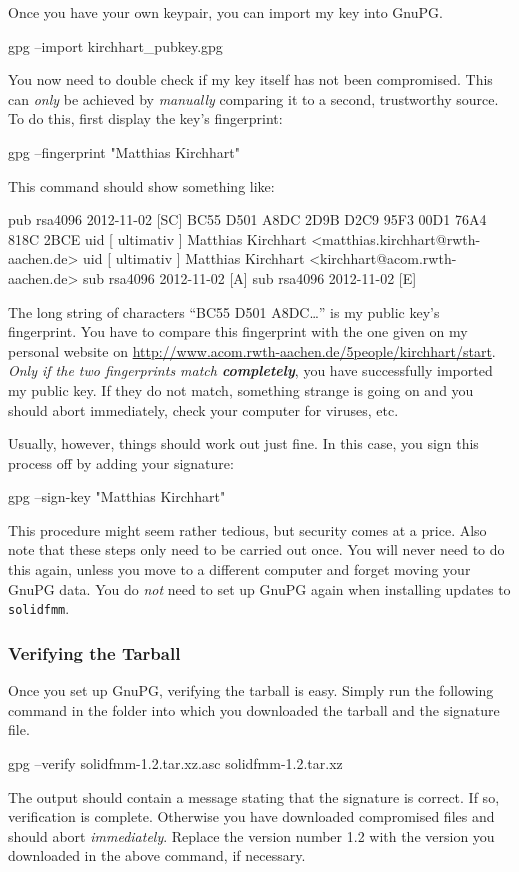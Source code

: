 \documentclass{scrbook}
\newcommand{\solidfmm}{\texttt{solidfmm}}
\begin{document}
Once you have your own keypair, you can import my key into GnuPG.
\begin{commandshell*}
gpg --import kirchhart_pubkey.gpg
\end{commandshell*}
You now need to double check if my key itself has not been compromised. This
can \emph{only} be achieved by \emph{manually} comparing it to a second,
trustworthy source. To do this, first display the key's fingerprint:
\begin{commandshell*}
gpg --fingerprint "Matthias Kirchhart"
\end{commandshell*}
This command should show something like:
\begin{commandshell*}
pub   rsa4096 2012-11-02 [SC]
      BC55 D501 A8DC 2D9B D2C9  95F3 00D1 76A4 818C 2BCE
uid        [ ultimativ ] Matthias Kirchhart <matthias.kirchhart@rwth-aachen.de>
uid        [ ultimativ ] Matthias Kirchhart <kirchhart@acom.rwth-aachen.de>
sub   rsa4096 2012-11-02 [A]
sub   rsa4096 2012-11-02 [E]
\end{commandshell*}
The long string of characters \enquote{BC55 D501 A8DC…} is my public key's
fingerprint. You have to compare this fingerprint with the one given on
my personal website on
\url{http://www.acom.rwth-aachen.de/5people/kirchhart/start}.
\emph{Only if the two fingerprints match \textbf{completely}}, you have
successfully imported my public key. If they do not match, something strange
is going on and you should abort immediately, check your computer for viruses,
etc.

Usually, however, things should work out just fine. In this case, you sign this
process off by adding your signature:
\begin{commandshell*}
gpg --sign-key "Matthias Kirchhart"
\end{commandshell*}
This procedure might seem rather tedious, but security comes at a price. Also
note  that these steps only need to be carried out once. You will never need to
do this again, unless you move to a different computer and forget moving your
GnuPG data. You do \emph{not} need to set up GnuPG again when installing
updates to \solidfmm.

\subsubsection{Verifying the Tarball}
Once you set up GnuPG, verifying the tarball is easy. Simply run the following
command in the folder into which you downloaded the tarball and the signature
file. 
\begin{commandshell*}
gpg --verify solidfmm-1.2.tar.xz.asc solidfmm-1.2.tar.xz
\end{commandshell*}
The output should contain a message stating that the signature is correct. If
so, verification is complete. Otherwise you have downloaded compromised files
and should abort \emph{immediately}. Replace the version number {1{.}2} with the
version you downloaded in the above command, if necessary.
\end{document}
